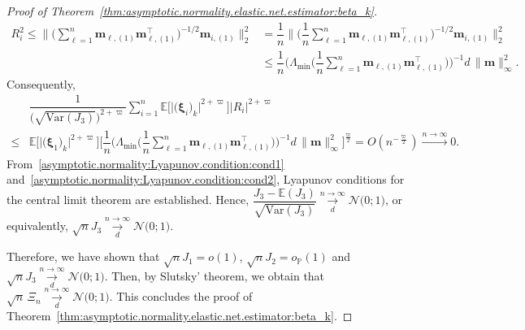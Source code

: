 \documentclass[
  12pt]{article}
\newcommand{\Var}{\mbox{Var}}
\def\E{\mathbb{E}}
\def\M{\mathbf{m}}
\begin{document}
\begin{proof}[Proof of Theorem~\ref{thm:asymptotic.normality.elastic.net.estimator:beta_k}]
\begin{align*}
		R_{i}^{2}  \leq   \Big\| \Big(  \sum_{\ell = 1}^{n} \M_{\ell,(1)}  \M_{\ell,(1)}^{\top} \Big)^{-1/2}     \M_{i,(1)} \Big\|_{2}^{2}  
		&=  \dfrac{1}{n} \Big\| \Big(  \dfrac{1}{n}   \sum_{\ell = 1}^{n} \M_{\ell,(1)}  \M_{\ell,(1)}^{\top} \Big)^{-1/2}     \M_{i,(1)} \Big\|_{2}^{2}  
		\\
		&\leq   \dfrac{1}{n}   \Big(  \Lambda_{\min} \big( \dfrac{1}{n}   \sum_{\ell = 1}^{n} \M_{\ell,(1)}  \M_{\ell,(1)}^{\top} \big)   \Big)^{-1} d  \,  \big\| \M  \big\|_{\infty}^{2}.
	\end{align*}
	Consequently, 
	\begin{align}
		&\dfrac{ 1 }{ \big( \sqrt{ \textrm{Var}(J_{3}) }  \big)^{2 + \varpi} } \sum_{i = 1}^{n}  \mathbb{E} \Big[  \big|  \big( \bm{\xi}_{i}   \big)_{k}   \big|^{2 + \varpi} \Big] \big| R_{i} \big|^{2 + \varpi}   
		\nonumber   
		\\
		\leq  &    \mathbb{E} \big[  \big|  \big( \bm{\xi}_{1} \big)_{k}  \big|^{2 + \varpi}  \big]   
		\Big[ \dfrac{1}{n}  \Big(  \Lambda_{\min} \big( \dfrac{1}{n} \sum_{\ell = 1}^{n} \M_{\ell,(1)}  \M_{\ell,(1)}^{\top} \big)   \Big)^{-1} d  \,  \big\| \M  \big\|_{\infty}^{2} \Big]^{ \frac{\varpi}{2}}  =  O(n^{-\frac{\varpi}{2}})  
		\overset{ n \rightarrow \infty }{\longrightarrow}  0  .  
		\label{asymptotic.normality:Lyapunov.condition:cond2}
	\end{align}
	From~\eqref{asymptotic.normality:Lyapunov.condition:cond1} and~\eqref{asymptotic.normality:Lyapunov.condition:cond2}, Lyapunov conditions for the central limit theorem are established. Hence, $\dfrac{J_{3} - \E(J_{3}) }{ \sqrt{\Var(J_{3})} } \underset{d}{  \overset{ n \rightarrow \infty }{\longrightarrow} } \mathcal{N} \big( 0 ; 1 \big) $, or  equivalently, $ \sqrt{n}  J_{3} \underset{d}{  \overset{ n \rightarrow \infty }{\longrightarrow} } \mathcal{N} \big( 0 ; 1 \big)$.    
	
	\medskip
	
	Therefore, we have shown that $\sqrt{n}  J_{1} = o(1)$, $\sqrt{n} J_{2} = o_{\mathbb{P}}(1)$ and $\sqrt{n} J_{3} \underset{d}{  \overset{ n \rightarrow \infty }{\longrightarrow} } \mathcal{N} \big( 0 ; 1 \big) $. Then, by Slutsky' theorem, we obtain that $ \sqrt{n} \,   \Xi_{n} \underset{d}{ \overset{ n \rightarrow \infty }{\longrightarrow} } \mathcal{N} \big( 0 ; 1\big)$.  
	This concludes the proof of Theorem~\ref{thm:asymptotic.normality.elastic.net.estimator:beta_k}. 
\end{proof}   
\end{document}
